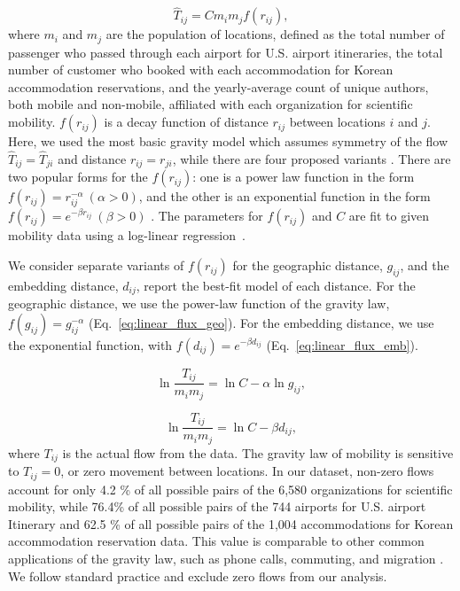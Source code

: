 \documentclass[12pt]{article} %
\begin{document}
%
%
\begin{equation}
	\label{eq:gravity_basic}
	\hat{T}_{ij} = Cm_{i}m_{j}f(r_{ij}),
\end{equation}
where $m_{i}$ and $m_{j}$ are the population of locations, defined as the total number of passenger who passed through each airport for U.S. airport itineraries,  the total number of customer who booked with each accommodation for Korean accommodation reservations, and the yearly-average count of unique authors, both mobile and non-mobile, affiliated with each organization for scientific mobility.
$f(r_{ij})$ is a decay function of distance $r_{ij}$ between locations $i$ and $j$.
Here, we used the most basic gravity model which assumes symmetry of the flow $\hat{T}_{ij} =\hat{T}_{ji}$ and distance $r_{ij} = r_{ji}$, while there are four proposed variants \autocite{wilson2011entropy}.
There are two popular forms for the $f(r_{ij})$:
one is a power law function in the form $f(r_{ij})= r^{-\alpha}_{ij} \ (\alpha > 0)$, and the other is an exponential function in the form $f(r_{ij}) = e^{-\beta r_{ij}} \ (\beta > 0)$ \autocite{chen2015distance}.
The parameters for $f(r_{ij})$ and $C$ are fit to given mobility data using a log-linear regression~\autocite{jung2008highwaygravity, curiel2018citygravity, truscott2012epidemicgravity, hong2016busgravity, simini2012universal}.

We consider separate variants of $f(r_{ij})$ for the geographic distance, $g_{ij}$, and the embedding distance, $d_{ij}$, report the best-fit model of each distance.
For the geographic distance, we use the power-law function of the gravity law, $f(g_{ij})= g^{-\alpha}_{ij}$ (Eq.~\ref{eq:linear_flux_geo}).
For the embedding distance, we use the exponential function, with $f(d_{ij}) = e^{-\beta d_{ij}}$ (Eq.~\ref{eq:linear_flux_emb}).

\begin{equation}
	\label{eq:linear_flux_geo}
	\ln\frac{T_{ij}}{m_im_j} = \ln C  - \alpha \ln g_{ij},
\end{equation}

\begin{equation}
	\label{eq:linear_flux_emb}
	\ln\frac{T_{ij}}{m_im_j} = \ln C - \beta d_{ij},
\end{equation}
where $T_{ij}$ is the actual flow from the data.
The gravity law of mobility is sensitive to $T_{ij} = 0$, or zero movement between locations.
In our dataset, non-zero flows account for only 4.2 \% of all possible pairs of the 6,580 organizations for scientific mobility, while 76.4\% of all possible pairs of the 744 airports for U.S. airport Itinerary and 62.5 \% of all possible pairs of the 1,004 accommodations for Korean accommodation reservation data.
This value is comparable to other common applications of the gravity law, such as phone calls, commuting, and migration \autocite{simini2012universal}.
We follow standard practice and exclude zero flows from our analysis.
\end{document}
